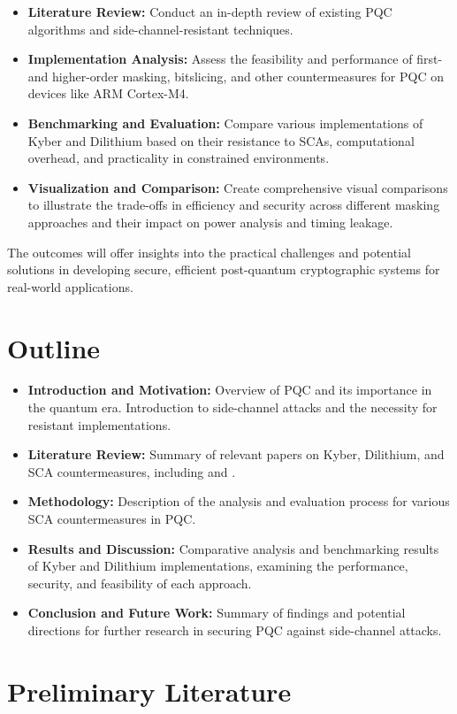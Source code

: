 \documentclass{scrartcl}
\begin{document}
\begin{itemize}
	\item \textbf{Literature Review:} Conduct an in-depth review of existing PQC algorithms and side-channel-resistant techniques.
	\item \textbf{Implementation Analysis:} Assess the feasibility and performance of first- and higher-order masking, bitslicing, and other countermeasures for PQC on devices like ARM Cortex-M4.
	\item \textbf{Benchmarking and Evaluation:} Compare various implementations of Kyber and Dilithium based on their resistance to SCAs, computational overhead, and practicality in constrained environments.
	\item \textbf{Visualization and Comparison:} Create comprehensive visual comparisons to illustrate the trade-offs in efficiency and security across different masking approaches and their impact on power analysis and timing leakage.
\end{itemize}

The outcomes will offer insights into the practical challenges and potential solutions in developing secure, efficient post-quantum cryptographic systems for real-world applications.

\section*{Outline}
\begin{itemize}
	\item \textbf{Introduction and Motivation:} Overview of PQC and its importance in the quantum era. Introduction to side-channel attacks and the necessity for resistant implementations.
	\item \textbf{Literature Review:} Summary of relevant papers on Kyber, Dilithium, and SCA countermeasures, including \cite{Bos21} and \cite{Azouaoui22}.
	\item \textbf{Methodology:} Description of the analysis and evaluation process for various SCA countermeasures in PQC.
	\item \textbf{Results and Discussion:} Comparative analysis and benchmarking results of Kyber and Dilithium implementations, examining the performance, security, and feasibility of each approach.
	\item \textbf{Conclusion and Future Work:} Summary of findings and potential directions for further research in securing PQC against side-channel attacks.
\end{itemize}

\section*{Preliminary Literature}


\end{document}
